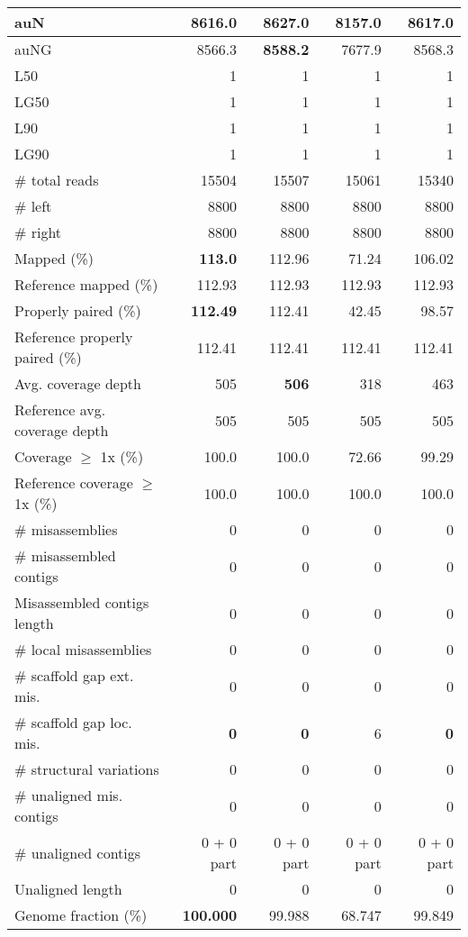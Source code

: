 \documentclass[12pt,a4paper]{article}
\begin{document}
\begin{table}[ht]
\begin{center}
\begin{tabular}{|l*{4}{|r}|}
auN & 8616.0 & {\bf 8627.0} & 8157.0 & 8617.0 \\ \hline
auNG & 8566.3 & {\bf 8588.2} & 7677.9 & 8568.3 \\ \hline
L50 & 1 & 1 & 1 & 1 \\ \hline
LG50 & 1 & 1 & 1 & 1 \\ \hline
L90 & 1 & 1 & 1 & 1 \\ \hline
LG90 & 1 & 1 & 1 & 1 \\ \hline
\# total reads & 15504 & 15507 & 15061 & 15340 \\ \hline
\# left & 8800 & 8800 & 8800 & 8800 \\ \hline
\# right & 8800 & 8800 & 8800 & 8800 \\ \hline
Mapped (\%) & {\bf 113.0} & 112.96 & 71.24 & 106.02 \\ \hline
Reference mapped (\%) & 112.93 & 112.93 & 112.93 & 112.93 \\ \hline
Properly paired (\%) & {\bf 112.49} & 112.41 & 42.45 & 98.57 \\ \hline
Reference properly paired (\%) & 112.41 & 112.41 & 112.41 & 112.41 \\ \hline
Avg. coverage depth & 505 & {\bf 506} & 318 & 463 \\ \hline
Reference avg. coverage depth & 505 & 505 & 505 & 505 \\ \hline
Coverage $\geq$ 1x (\%) & 100.0 & 100.0 & 72.66 & 99.29 \\ \hline
Reference coverage $\geq$ 1x (\%) & 100.0 & 100.0 & 100.0 & 100.0 \\ \hline
\# misassemblies & 0 & 0 & 0 & 0 \\ \hline
\# misassembled contigs & 0 & 0 & 0 & 0 \\ \hline
Misassembled contigs length & 0 & 0 & 0 & 0 \\ \hline
\# local misassemblies & 0 & 0 & 0 & 0 \\ \hline
\# scaffold gap ext. mis. & 0 & 0 & 0 & 0 \\ \hline
\# scaffold gap loc. mis. & {\bf 0} & {\bf 0} & 6 & {\bf 0} \\ \hline
\# structural variations & 0 & 0 & 0 & 0 \\ \hline
\# unaligned mis. contigs & 0 & 0 & 0 & 0 \\ \hline
\# unaligned contigs & 0 + 0 part & 0 + 0 part & 0 + 0 part & 0 + 0 part \\ \hline
Unaligned length & 0 & 0 & 0 & 0 \\ \hline
Genome fraction (\%) & {\bf 100.000} & 99.988 & 68.747 & 99.849 \\ \hline

\end{tabular}
\end{center}
\end{table}
\end{document}
